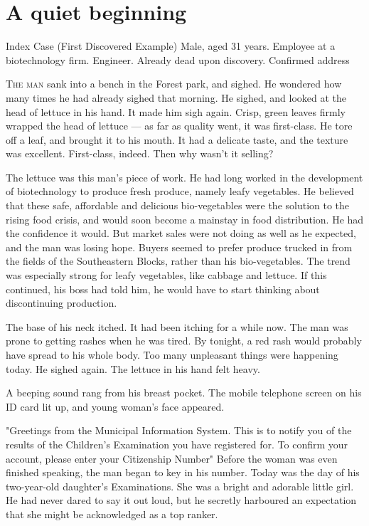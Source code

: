 
\chapter{A quiet beginning}

\begin{boxed}{Index Case (First Discovered Example)}
	Male, aged 31 years. Employee at a biotechnology firm. Engineer. Already
	dead upon discovery. Confirmed address\el 
\end{boxed}

\lettrine{T}{he man} sank into a bench in the Forest park, and sighed. He wondered
how many times he had already sighed that morning. He sighed, and looked
at the head of lettuce in his hand. It made him sigh again. Crisp, green
leaves firmly wrapped the head of lettuce --- as far as quality went, it
was first-class. He tore off a leaf, and brought it to his mouth. It had
a delicate taste, and the texture was excellent. First-class, indeed.
Then why wasn't it selling?

The lettuce was this man's piece of work. He had long worked in the
development of biotechnology to produce fresh produce, namely leafy
vegetables. He believed that these safe, affordable and delicious
bio-vegetables were the solution to the rising food crisis, and would
soon become a mainstay in food distribution. He had the confidence it
would. But market sales were not doing as well as he expected, and the
man was losing hope. Buyers seemed to prefer produce trucked in from the
fields of the Southeastern Blocks, rather than his bio-vegetables. The
trend was especially strong for leafy vegetables, like cabbage and
lettuce. If this continued, his boss had told him, he would have to
start thinking about discontinuing production.

The base of his neck itched. It had been itching for a while now. The
man was prone to getting rashes when he was tired. By tonight, a red
rash would probably have spread to his whole body. Too many unpleasant
things were happening today. He sighed again. The lettuce in his hand
felt heavy.

A beeping sound rang from his breast pocket. The mobile telephone screen
on his ID card lit up, and young woman's face appeared.

"Greetings from the Municipal Information System. This is to notify you
of the results of the Children's Examination you have registered for. To
confirm your account, please enter your Citizenship Number\el " Before
the woman was even finished speaking, the man began to key in his
number. Today was the day of his two-year-old daughter's Examinations.
She was a bright and adorable little girl. He had never dared to say it
out loud, but he secretly harboured an expectation that she might be
acknowledged as a top ranker.

